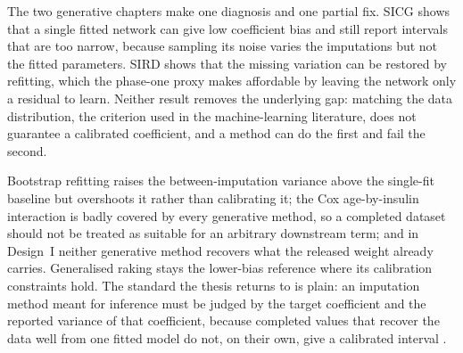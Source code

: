 The two generative chapters make one diagnosis and one partial fix. SICG shows that a single fitted network can give low coefficient bias and still report intervals that are too narrow, because sampling its noise varies the imputations but not the fitted parameters. SIRD shows that the missing variation can be restored by refitting, which the phase-one proxy makes affordable by leaving the network only a residual to learn. Neither result removes the underlying gap: matching the data distribution, the criterion used in the machine-learning literature, does not guarantee a calibrated coefficient, and a method can do the first and fail the second.

Bootstrap refitting raises the between-imputation variance above the single-fit baseline but overshoots it rather than calibrating it; the Cox age-by-insulin interaction is badly covered by every generative method, so a completed dataset should not be treated as suitable for an arbitrary downstream term; and in Design~I neither generative method recovers what the released weight already carries. Generalised raking stays the lower-bias reference where its calibration constraints hold. The standard the thesis returns to is plain: an imputation method meant for inference must be judged by the target coefficient and the reported variance of that coefficient, because completed values that recover the data well from one fitted model do not, on their own, give a calibrated interval \citep{naf2023imputation,Rubin1987}.
